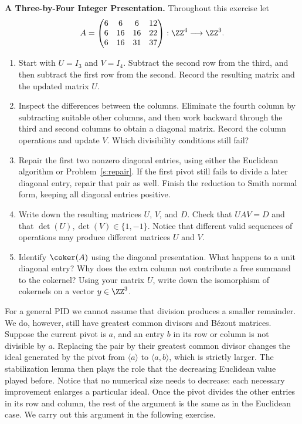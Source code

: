 \documentclass[12pt,reqno]{amsart}
\begin{document}
\begin{problems}
\item\label{s:threebyfour} \textbf{A Three-by-Four Integer Presentation.} Throughout this exercise let
\[
A=\begin{pmatrix}
6&6&6&12\\
6&16&16&22\\
6&16&31&37
\end{pmatrix}:\ZZ^4\longrightarrow\ZZ^3.
\]
\begin{enumerate}
\item Start with $U=I_3$ and $V=I_4$. Subtract the second row from the third, and then subtract the first row from the second. Record the resulting matrix and the updated matrix $U$.
\item Inspect the differences between the columns. Eliminate the fourth column by subtracting suitable other columns, and then work backward through the third and second columns to obtain a diagonal matrix. Record the column operations and update $V$. Which divisibility conditions still fail?
\item Repair the first two nonzero diagonal entries, using either the Euclidean algorithm or Problem~\ref{s:repair}. If the first pivot still fails to divide a later diagonal entry, repair that pair as well. Finish the reduction to Smith normal form, keeping all diagonal entries positive.
\item Write down the resulting matrices $U$, $V$, and $D$. Check that $UAV=D$ and that $\det(U),\det(V)\in\{1,-1\}$. Notice that different valid sequences of operations may produce different matrices $U$ and $V$.
\item Identify $\coker(A)$ using the diagonal presentation. What happens to a unit diagonal entry? Why does the extra column not contribute a free summand to the cokernel? Using your matrix $U$, write down the isomorphism of cokernels on a vector $y\in\ZZ^3$.
\end{enumerate}
\end{problems}

\hrulefill

For a general PID we cannot assume that division produces a smaller remainder. We do, however, still have greatest common divisors and B\'ezout matrices. Suppose the current pivot is $a$, and an entry $b$ in its row or column is not divisible by $a$. Replacing the pair by their greatest common divisor changes the ideal generated by the pivot from $\langle a\rangle$ to $\langle a,b\rangle$, which is strictly larger. The stabilization lemma then plays the role that the decreasing Euclidean value played before. Notice that no numerical size needs to decrease: each necessary improvement enlarges a particular ideal. Once the pivot divides the other entries in its row and column, the rest of the argument is the same as in the Euclidean case. We carry out this argument in the following exercise.
\end{document}
